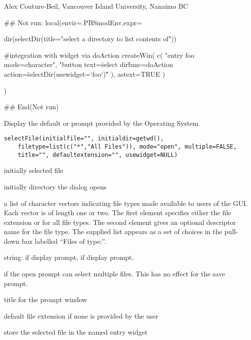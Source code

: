 \documentclass[letterpaper]{book}
\begin{document}
%
\begin{Author}\relax
Alex Couture-Beil, Vancouver Island University, Nanaimo BC
\end{Author}
%
\begin{SeeAlso}\relax
{}
\end{SeeAlso}
%
\begin{Examples}
\begin{ExampleCode}
## Not run: 
local(envir=.PBSmodEnv,expr={
  dir(selectDir(title="select a directory to list contents of"))

  #integration with widget via doAction
  createWin( c( "entry foo mode=character", 
    "button text=\"select dir\" 
    func=doAction action=\"selectDir(usewidget=`foo`)\"" ), astext=TRUE )
})

## End(Not run)
\end{ExampleCode}
\end{Examples}
%
\begin{Description}\relax
Display the default  or   prompt provided by the Operating System.
\end{Description}
%
\begin{Usage}
\begin{verbatim}
selectFile(initialfile="", initialdir=getwd(), 
    filetype=list(c("*","All Files")), mode="open", multiple=FALSE,
    title="", defaultextension="", usewidget=NULL)
\end{verbatim}
\end{Usage}
%
\begin{Arguments}
\begin{ldescription}
\item[\code{initialfile}] initially selected file
\item[\code{initialdir}] initially directory the dialog opens 
\item[\code{filetype}] a list of character vectors indicating file types made available 
to users of the GUI. Each vector is of length one or two. The first element 
specifies either the file extension or  for all file types. The second 
element gives an optional descriptor name for the file type. The supplied 
 list appears as a set of choices in the pull-down box labelled 
``Files of type:''.
\item[\code{mode}] string: if  display  prompt, 
if  display  prompt.
\item[\code{multiple}] if  the open prompt can select multiple files. This has no
effect for the save prompt.
\item[\code{title}] title for the prompt window
\item[\code{defaultextension}] default file extension if none is provided by the user
\item[\code{usewidget}] store the selected file in the named entry widget
\end{ldescription}
\end{Arguments}
\end{document}
